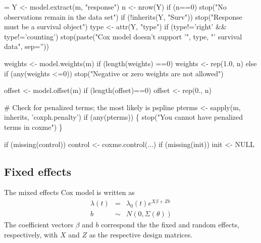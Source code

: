 \documentclass{article}
\begin{document}
\begin{nwchunk}
=
     Y <- model.extract(m, "response")
     n <- nrow(Y)
     if (n==0) stop("No observations remain in the data set")
     if (!inherits(Y, "Surv")) stop("Response must be a survival object")
     type <- attr(Y, "type")
     if (type!='right' && type!='counting')
         stop(paste("Cox model doesn't support '", type,
                           "' survival data", sep=''))
 
     weights <- model.weights(m)
     if (length(weights) ==0) weights <- rep(1.0, n)
     else if (any(weights <=0))
         stop("Negative or zero weights are not allowed")
 
     offset <- model.offset(m)
     if (length(offset)==0) offset <- rep(0., n)
 
     # Check for penalized terms; the most likely is pspline
     pterms <- sapply(m, inherits, 'coxph.penalty')
     if (any(pterms)) \{
         stop("You cannot have penalized terms in coxme")
         \}
 
     if (missing(control)) control <- coxme.control(...)
     if (missing(init)) init <- NULL
\end{nwchunk}
%
%
\subsection{Fixed effects}
The mixed effects Cox model is written as
\begin{eqnarray*}
  \lambda(t) &=& \lambda_0(t) e^{X \beta + Z b}\\
  b &\sim& N(0, \Sigma(\theta))
\end{eqnarray*}
The coefficient vectors $\beta$ and $b$ correspond the the
fixed and random effects, respectively,
with $X$ and $Z$ as the respective design matrices.
\end{document}
